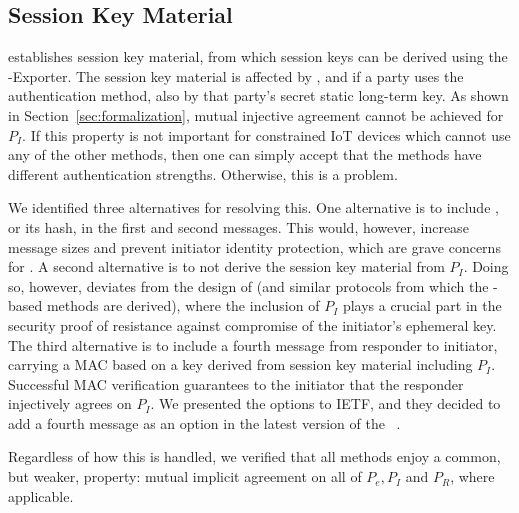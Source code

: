 \documentclass[a4paper,twoside,draft]{article}
\begin{document}
\subsection{Session Key Material}
\label{sec:sessionKeyMaterial}
\mEdhoc{} establishes session key material, from which session keys
can be derived using the \mEdhoc{}-Exporter.
%
The session key material is affected by \mGxy{}, and if a party uses the
\mStat{} authentication method, also by that party's secret static long-term key.
%
As shown in Section~\ref{sec:formalization}, mutual injective agreement cannot
be achieved for $P_I$.
%
If this property is not important for constrained IoT devices which cannot use
any of the other methods, then one can simply accept that the methods have
different authentication strengths.
%
Otherwise, this is a problem.
%

We identified three alternatives for resolving this.
%
One alternative is to include \mIdcredi{}, or its hash, in the first and
second messages.
%
This would, however, increase message sizes and prevent initiator identity
protection, which are grave concerns for \mEdhoc{}.
%
A second alternative is to not derive the session key material from $P_I$.
%
Doing so, however, deviates from the design of \mOptls{} (and similar protocols
from which the \mStat{}-based methods are derived), where the inclusion of
$P_I$ plays a crucial part in the security proof of resistance against
compromise of the initiator's ephemeral key.
%
The third alternative is to include a fourth message from responder to initiator,
carrying a MAC based on a key derived from session key material including $P_I$.
%
Successful MAC verification guarantees
to the initiator that the responder injectively agrees on $P_I$.
%
We presented the options to IETF, and they decided to add a
fourth message as an option in the latest version of the
\mSpec{}~\cite{latest-ietf-lake-edhoc-05}.
%

Regardless of how this is handled, we verified that all methods
enjoy a common, but weaker, property: mutual implicit agreement
on all of $P_e, P_I$ and $P_R$, where applicable.
%
\end{document}
